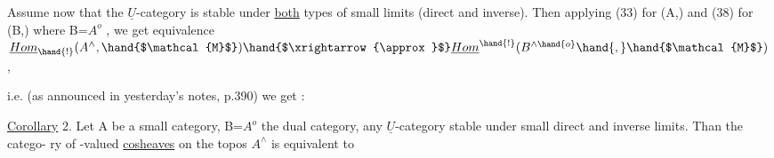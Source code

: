 Assume now that the $\underline{U}$-category  is stable under \uline{both} types of
small limits (direct and inverse). Then applying (33) for (A,) and
(38) for (B,) where B=$A^{o}$ , we get  equivalence
  \hand{:} $\underline{Hom}_{\hand{!}}(A^{\wedge}, \hand{$\mathcal{M}$}) \hand{$\xrightarrow{\approx}$} \underline{Hom}^{\hand{!}}(B^{\wedge\hand{o}}\hand{,} \hand{$\mathcal{M}$})$ ,

i.e. (as announced in yesterday's notes, p.390) we get :

\uline{Corollary} 2. Let A be a small category, B=$A^{o}$ the dual category,  any
$\underline{U}$-category stable under small direct and inverse limits. Than the catego-%
ry of -valued \uline{cosheaves} on the topos $A^{\wedge}$ is equivalent  to

